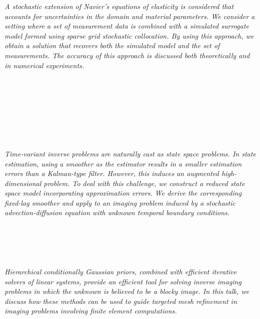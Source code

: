   \begin{multicols}{2}
      \textit{A stochastic extension of Navier's equations of elasticity is considered that accounts for uncertainties in the domain and material parameters. We consider a setting where a set of measurement data is combined with a simulated surrogate model formed using sparse grid stochastic collocation. By using this approach, we obtain a solution that recovers both the simulated model and the set of measurements. The accuracy of this approach is discussed both theoretically and in numerical experiments.}\\
\\ 
        \\
        \\\\
        \\
        \\\\
\\
      \textit{Time-variant inverse problems are naturally cast as state space problems. In state estimation, using a smoother as the estimator results in a smaller estimation errors than a Kalman-type filter. However, this induces an augmented high-dimensional problem. To deal with this challenge, we construct a reduced state space model incorporating approximation errors. We derive the corresponding fixed-lag smoother and apply to an imaging problem induced by a stochastic advection-diffusion equation with unknown temporal boundary conditions.}\\
\\ 
        \\
        \\\\
\\
      \textit{Hierarchical conditionally Gaussian priors, combined with efficient iterative solvers of linear systems, provide an efficient tool for solving inverse imaging problems in which the unknown is believed to be a blocky image. In this talk, we discuss how these methods can be used to guide targeted mesh refinement in imaging problems involving finite element computations.}\\
\\ 
        \\
        \\\\

\end{multicols}
